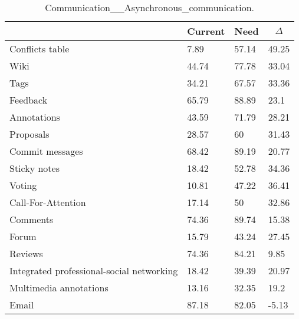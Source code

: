 
  \begin{table*}[]
  \centering
  \notsotiny
  \caption{ Communication__Asynchronous_communication.}
\label{tab:communication__asynchronous_communication}
\begin{tabular}{|l|l|l|l|}
  \hline
  \rowcolor[HTML]{C0C0C0}
    \multicolumn{1}{|c|}{Feature} & \multicolumn{1}{c|}{Current} & \multicolumn{1}{c|}{Need} & \multicolumn{1}{c|}{$\Delta$} \\ \hline
  Conflicts table & 7.89 & 57.14 & 49.25 \\ \hline 
Wiki & 44.74 & 77.78 & 33.04 \\ \hline 
Tags & 34.21 & 67.57 & 33.36 \\ \hline 
Feedback & 65.79 & 88.89 & 23.1 \\ \hline 
Annotations & 43.59 & 71.79 & 28.21 \\ \hline 
Proposals & 28.57 & 60 & 31.43 \\ \hline 
Commit messages & 68.42 & 89.19 & 20.77 \\ \hline 
Sticky notes & 18.42 & 52.78 & 34.36 \\ \hline 
Voting & 10.81 & 47.22 & 36.41 \\ \hline 
Call-For-Attention & 17.14 & 50 & 32.86 \\ \hline 
Comments & 74.36 & 89.74 & 15.38 \\ \hline 
Forum & 15.79 & 43.24 & 27.45 \\ \hline 
Reviews & 74.36 & 84.21 & 9.85 \\ \hline 
Integrated professional-social networking & 18.42 & 39.39 & 20.97 \\ \hline 
Multimedia annotations & 13.16 & 32.35 & 19.2 \\ \hline 
Email & 87.18 & 82.05 & -5.13 \\ \hline 
\end{tabular}%
  \end{table*}